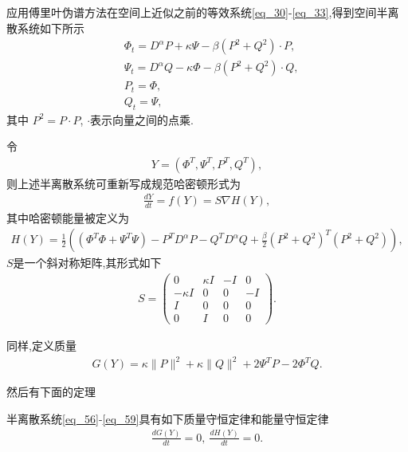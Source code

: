 应用傅里叶伪谱方法在空间上近似之前的等效系统\eqref{eq_30}-\eqref{eq_33},得到空间半离散系统如下所示\begin{align}
&\varPhi_{t}=D^{\alpha}P+\kappa \Psi-\beta \left( P^{2}+Q^{2}\right)\cdot P,\label{eq_56}\\
&\Psi_{t}=D^{\alpha}Q-\kappa \varPhi-\beta \left( P^{2}+Q^{2}\right)\cdot Q,\label{eq_57}\\
&P_t=\varPhi,\label{eq_58}\\
&Q_t=\Psi,\label{eq_59}
\end{align}
其中 $P^{2}=P \cdot P$, $\cdot$表示向量之间的点乘.

令
\begin{align}\label{eq_60a}
Y=\left(\varPhi^{T}, \Psi^{T}, P^{T}, Q^{T}\right),
\end{align}
则上述半离散系统可重新写成规范哈密顿形式为\begin{align}\label{eq_60}
\frac{d Y}{d t}=f(Y)=S \nabla H(Y),
\end{align}
其中哈密顿能量被定义为
\begin{align}\label{eq_61}
	H(Y)=\frac{1}{2}\left((\varPhi^{T}\varPhi+\Psi^{T}\Psi)-P^{T} D^{\alpha} P-Q^{T} D^{\alpha} Q+\frac{\beta}{2}(P^2+Q^2)^{T}(P^2+Q^2)\right),
\end{align}
$S$是一个斜对称矩阵,其形式如下
\begin{align}\label{eq_62}
S=\left(\begin{array}{cccc}
0 & \kappa I & -I & 0 \\
-\kappa I & 0 & 0 & -I \\
I & 0 & 0 & 0 \\
0 & I & 0 & 0
\end{array}\right).
\end{align}

同样,定义质量
\begin{align}\label{eq_63}
G(Y)=\kappa\|P\|^{2}+\kappa\|Q\|^{2} +2\Psi^{T}P-2\varPhi^{T}Q.
\end{align}

然后有下面的定理
\begin{thm}	\label{thm3}
半离散系统\eqref{eq_56}-\eqref{eq_59}具有如下质量守恒定律和能量守恒定律
\begin{align}
\frac{d G(Y)}{d t}=0,~\frac{d H(Y)}{d t}=0.
\end{align}
\end{thm}

